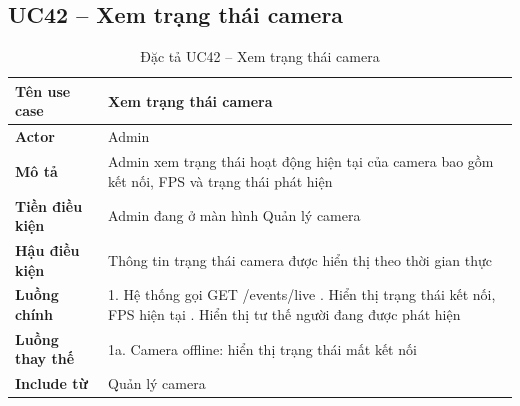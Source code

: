 \subsection*{UC42 -- Xem trạng thái camera}
\begin{table}[H]
    \captionsetup{justification=raggedright, singlelinecheck=false}
    \caption{Đặc tả UC42 -- Xem trạng thái camera}
\centering
\begin{tabular}{|p{3.5cm}|p{10cm}|}
\hline
\textbf{Tên use case} & Xem trạng thái camera \\
\hline
\textbf{Actor} & Admin \\
\hline
\textbf{Mô tả} & Admin xem trạng thái hoạt động hiện tại
  của camera bao gồm kết nối, FPS và trạng thái phát hiện \\
\hline
\textbf{Tiền điều kiện} & Admin đang ở màn hình Quản lý camera \\
\hline
\textbf{Hậu điều kiện} & Thông tin trạng thái camera được
  hiển thị theo thời gian thực \\
\hline
\textbf{Luồng chính} &
  1. Hệ thống gọi GET /events/live \newline
  2. Hiển thị trạng thái kết nối, FPS hiện tại \newline
  3. Hiển thị tư thế người đang được phát hiện \\
\hline
\textbf{Luồng thay thế} &
  1a. Camera offline: hiển thị trạng thái mất kết nối \\
\hline
\textbf{Include từ} & Quản lý camera \\
\hline
\end{tabular}

\end{table}

